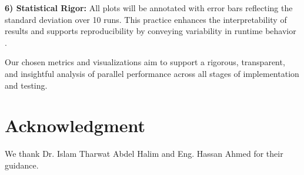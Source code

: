 \documentclass[conference, 10pt]{IEEEtran}
\begin{document}
\vspace{0.5em}
\textbf{6) Statistical Rigor:} 
All plots will be annotated with error bars reflecting the standard deviation over 10 runs. This practice enhances the interpretability of results and supports reproducibility by conveying variability in runtime behavior \cite{Yoon2012-sx}.

Our chosen metrics and visualizations aim to support a rigorous, transparent, and insightful analysis of parallel performance across all stages of implementation and testing.




\section*{Acknowledgment} 
We thank Dr. Islam Tharwat Abdel Halim and Eng. Hassan Ahmed for their guidance.


 
\end{document}

